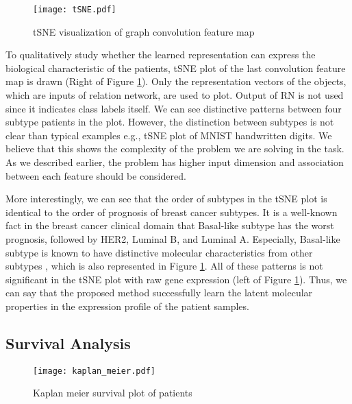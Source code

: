 \documentclass{article}
\begin{document}
\begin{figure}[!t]
\centering
\texttt{[image: tSNE.pdf]}
\caption{tSNE visualization of graph convolution feature map}
\label{fig_tSNE}
\end{figure}

To qualitatively study whether the learned representation can express the biological characteristic of the patients, tSNE plot \cite{maaten2008visualizing} of the last convolution feature map is drawn (Right of Figure \ref{fig_tSNE}). Only the representation vectors of the objects, which are inputs of relation network, are used to plot. Output of RN is not used since it indicates class labels itself. We can see distinctive patterns between four subtype patients in the plot. However, the distinction between subtypes is not clear than typical examples e.g., tSNE plot of MNIST handwritten digits. We believe that this shows the complexity of the problem we are solving in the task. As we described earlier, the problem has higher input dimension and association between each feature should be considered.

More interestingly, we can see that the order of subtypes in the tSNE plot is identical to the order of prognosis of breast cancer subtypes. It is a well-known fact in the breast cancer clinical domain that Basal-like subtype has the worst prognosis, followed by HER2, Luminal B, and Luminal A. Especially, Basal-like subtype is known to have distinctive molecular characteristics from other subtypes \cite{bertucci2012basal}, which is also represented in Figure \ref{fig_tSNE}. All of these patterns is not significant in the tSNE plot with raw gene expression (left of Figure \ref{fig_tSNE}). Thus, we can say that the proposed method successfully learn the latent molecular properties in the expression profile of the patient samples.  


\subsection{Survival Analysis}

\begin{figure}[!t]
\centering
\texttt{[image: kaplan\_meier.pdf]}
\caption{Kaplan meier survival plot of patients}
\label{fig_KM}
\end{figure}
\end{document}
